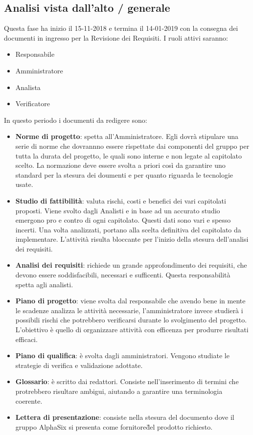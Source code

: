     \subsection{Analisi vista dall'alto / generale}
        Questa fase ha inizio il 15-11-2018 e termina il 14-01-2019 con la consegna dei documenti in ingresso per la Revisione dei Requisiti. I ruoli attivi saranno: 
        \begin{itemize}
            \item Responsabile
            \item Amministratore
            \item Analista
            \item Verificatore
        \end{itemize}
        In questo periodo i documenti da redigere sono:
		\begin{itemize}
			\item \textbf{Norme di progetto}: spetta all'Amministratore. Egli dovrà stipulare una serie di norme
            che dovrannno essere rispettate dai componenti del gruppo per tutta la durata del progetto\GAlt,
            le quali sono interne e non legate al capitolato scelto. La normazione deve essere svolta a priori così da garantire uno standard
            per la stesura dei doumenti e per quanto riguarda le tecnologie usate.
			\item \textbf{Studio di fattibilità}: valuta rischi, costi e benefici dei vari capitolati proposti.
            Viene svolto dagli Analisti e in base ad un accurato studio emergono pro e contro di ogni capitolato. Questi dati
            sono vari e spesso incerti. Una volta analizzati, portano alla scelta definitiva del capitolato da implementare.
            L'attività risulta bloccante per l'inizio della stesura dell'analisi dei requisiti.
			\item \textbf{Analisi dei requisiti}: richiede un grande approfondimento dei requisiti, che devono essere
            soddisfacibili, necessari e sufficenti. Questa responsabilità spetta agli analisti.
			\item \textbf{Piano di progetto}: viene svolta dal responsabile che avendo bene in mente le scadenze analizza le
            attività necessarie, l'amministratore invece studierà i possibili rischi che potrebbero verificarsi durante lo
            svolgimento del progetto. L'obiettivo è quello di organizzare attività con efficenza per produrre risultati efficaci.
			\item \textbf{Piano di qualifica}: è svolta dagli amministratori. Vengono studiate le strategie di verifica
            e validazione adottate.
			\item \textbf{Glossario}: è scritto dai redattori. Consiste nell'inserimento di termini che protrebbero
            risultare ambigui, aiutando a garantire una terminologia coerente.
			\item \textbf{Lettera di presentazione}: consiste nella stesura del documento dove il gruppo AlphaSix si presenta
            come fornitore\G del prodotto richiesto.
		\end{itemize}
		
